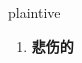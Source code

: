 
\begin{frame}
{\huge plaintive}
\begin{center}
\begin{enumerate}\Large
  \item \textbf{悲伤的}
\end{enumerate}
\end{center}
\end{frame}
